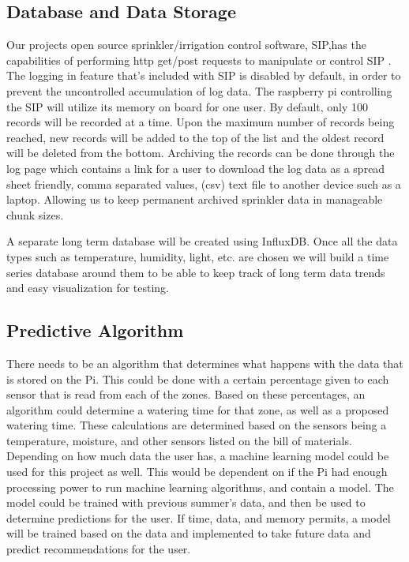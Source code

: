 \documentclass[letterpaper, 10 pt, conference]{ieeeconf}  %
\begin{document}
\subsection{Database and Data Storage}
Our projects open source sprinkler/irrigation control software, SIP,has the capabilities of performing http get/post requests to manipulate or control SIP \cite{SIP}. The logging in feature that's included with SIP is disabled by default, in order to prevent the uncontrolled accumulation of log data. The raspberry pi controlling the SIP will utilize its memory on board for one user. By default, only 100 records will be recorded at a time. Upon the maximum number of records being reached, new records will be added to the top of the list and the oldest record will be deleted from the bottom. Archiving the records can be done through the log page which contains a link for a user to download the log data as a spread sheet friendly, comma separated values, (csv) text file to another device such as a laptop. Allowing us to keep permanent archived sprinkler data in manageable chunk sizes.\cite{SIP}

A separate long term database will be created using InfluxDB. Once all the data types such as temperature, humidity, light, etc. are chosen we will build a time series database around them to be able to keep track of long term data trends and easy visualization for testing.

\subsection{Predictive Algorithm}
There needs to be an algorithm that determines what happens with the data that is stored on the Pi. This could be done with a certain percentage given to each sensor that is read from each of the zones. Based on these percentages, an algorithm could determine a watering time for that zone, as well as a proposed watering time. These calculations are determined based on the sensors being a temperature, moisture, and other sensors listed on the bill of materials. Depending on how much data the user has, a machine learning model could be used for this project as well. This would be dependent on if the Pi had enough processing power to run machine learning algorithms, and contain a model. The model could be trained with previous summer's data, and then be used to determine predictions for the user. If time, data, and memory permits, a model will be trained based on the data and implemented to take future data and predict recommendations for the user. 
\end{document}
